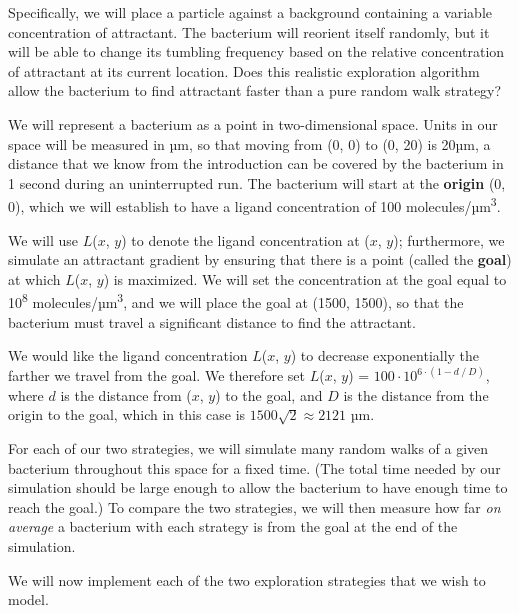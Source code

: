 Specifically, we will place a particle against a background containing a variable concentration of attractant. The bacterium will reorient itself randomly, but it will be able to change its tumbling frequency based on the relative concentration of attractant at its current location. Does this realistic exploration algorithm allow the bacterium to find attractant faster than a pure random walk strategy?

We will represent a bacterium as a point in two-dimensional space. Units in our space will be measured in µm, so that moving from (0, 0) to (0, 20) is 20µm, a distance that we know from the introduction can be covered by the bacterium in 1 second during an uninterrupted run. The bacterium will start at the \textbf{origin} (0, 0), which we will establish to have a ligand concentration of 100 molecules/µm\textsuperscript{3}.

We will use $L$($x$, $y$) to denote the ligand concentration at ($x$, $y$); furthermore, we simulate an attractant gradient by ensuring that there is a point (called the \textbf{goal}) at which $L$($x$, $y$) is maximized. We will set the concentration at the goal equal to 10\textsuperscript{8} molecules/µm\textsuperscript{3}, and we will place the goal at (1500, 1500), so that the bacterium must travel a significant distance to find the attractant.

We would like the ligand concentration $L$($x$, $y$) to decrease exponentially the farther we travel from the goal. We therefore set $L$($x$, $y$) = $100 \cdot 10^{6 \cdot (1-d\mathbin{/}D)}$, where $d$ is the distance from ($x$, $y$) to the goal, and $D$ is the distance from the origin to the goal, which in this case is $1500\sqrt{2} \approx 2121$ µm.\\

\begin{qbox}\end{qbox}

For each of our two strategies, we will simulate many random walks of a given bacterium throughout this space for a fixed time. (The total time needed by our simulation should be large enough to allow the bacterium to have enough time to reach the goal.) To compare the two strategies, we will then measure how far \textit{on average} a bacterium with each strategy is from the goal at the end of the simulation.

We will now implement each of the two exploration strategies that we wish to model.


